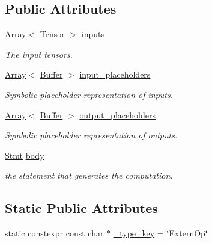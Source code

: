 \subsection*{Public Attributes}
\begin{DoxyCompactItemize}
\item 
\hyperlink{classtvm_1_1Array}{Array}$<$ \hyperlink{classtvm_1_1te_1_1Tensor}{Tensor} $>$ \hyperlink{classtvm_1_1te_1_1ExternOpNode_a12bd3ed18f9735abe6850766132eeb4c}{inputs}
\begin{DoxyCompactList}\small\item\em The input tensors. \end{DoxyCompactList}\item 
\hyperlink{classtvm_1_1Array}{Array}$<$ \hyperlink{classtvm_1_1tir_1_1Buffer}{Buffer} $>$ \hyperlink{classtvm_1_1te_1_1ExternOpNode_ae5c3fa995ba59e0e001d6b8f92e39c7a}{input\+\_\+placeholders}
\begin{DoxyCompactList}\small\item\em Symbolic placeholder representation of inputs. \end{DoxyCompactList}\item 
\hyperlink{classtvm_1_1Array}{Array}$<$ \hyperlink{classtvm_1_1tir_1_1Buffer}{Buffer} $>$ \hyperlink{classtvm_1_1te_1_1ExternOpNode_a004d2ec4a439339a2067e4fe7b93dac8}{output\+\_\+placeholders}
\begin{DoxyCompactList}\small\item\em Symbolic placeholder representation of outputs. \end{DoxyCompactList}\item 
\hyperlink{classtvm_1_1tir_1_1Stmt}{Stmt} \hyperlink{classtvm_1_1te_1_1ExternOpNode_a962b2cfaa4a2141c1b9247ac634b7bf2}{body}
\begin{DoxyCompactList}\small\item\em the statement that generates the computation. \end{DoxyCompactList}\end{DoxyCompactItemize}
\subsection*{Static Public Attributes}
\begin{DoxyCompactItemize}
\item 
static constexpr const char $\ast$ \hyperlink{classtvm_1_1te_1_1ExternOpNode_abed03a9c33cf6c1d526deae53bae55db}{\+\_\+type\+\_\+key} = \char`\"{}Extern\+Op\char`\"{}
\end{DoxyCompactItemize}


